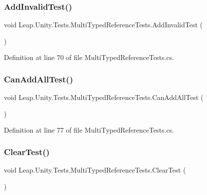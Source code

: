 \subsubsection{\texorpdfstring{AddInvalidTest()}{AddInvalidTest()}}
{\footnotesize\ttfamily void Leap.\+Unity.\+Tests.\+Multi\+Typed\+Reference\+Tests.\+Add\+Invalid\+Test (\begin{DoxyParamCaption}{ }\end{DoxyParamCaption})}



Definition at line 70 of file Multi\+Typed\+Reference\+Tests.\+cs.

\mbox{\label{class_leap_1_1_unity_1_1_tests_1_1_multi_typed_reference_tests_a2d87c654b7b44ad14bd65fea7b0a9f1c}} 
\subsubsection{\texorpdfstring{CanAddAllTest()}{CanAddAllTest()}}
{\footnotesize\ttfamily void Leap.\+Unity.\+Tests.\+Multi\+Typed\+Reference\+Tests.\+Can\+Add\+All\+Test (\begin{DoxyParamCaption}{ }\end{DoxyParamCaption})}



Definition at line 77 of file Multi\+Typed\+Reference\+Tests.\+cs.

\mbox{\label{class_leap_1_1_unity_1_1_tests_1_1_multi_typed_reference_tests_a96db2691ce3ea40dacc1e7074b34be46}} 
\subsubsection{\texorpdfstring{ClearTest()}{ClearTest()}}
{\footnotesize\ttfamily void Leap.\+Unity.\+Tests.\+Multi\+Typed\+Reference\+Tests.\+Clear\+Test (\begin{DoxyParamCaption}{ }\end{DoxyParamCaption})}



